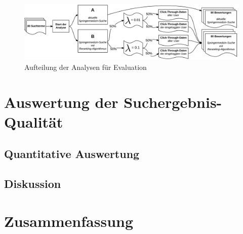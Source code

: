 \begin{figure}[H]
\centering
\vspace{-.5em}
\caption[Aufteilung der Analysen für Evaluation]{Aufteilung der Analysen für Evaluation}
\vspace{.5em}
\label{fig:AufteilungAnalysenEvaluation}
\includegraphics[width=0.9\linewidth]{gfx/EvaluationsvariantenRerankingSuche}
\vspace{-2em}
\end{figure}

\section{Auswertung der Suchergebnis-Qualität}
\label{sec:Evaluation:Auswertung}

\subsection{Quantitative Auswertung}
\label{sec:Evaluation:Auswertung:QuantitativeAuswertung}

\subsection{Diskussion}
\label{sec:Evaluation:Auswertung:Diskussion}

\section{Zusammenfassung}
\label{sec:Evaluation:Zusammenfassung}


